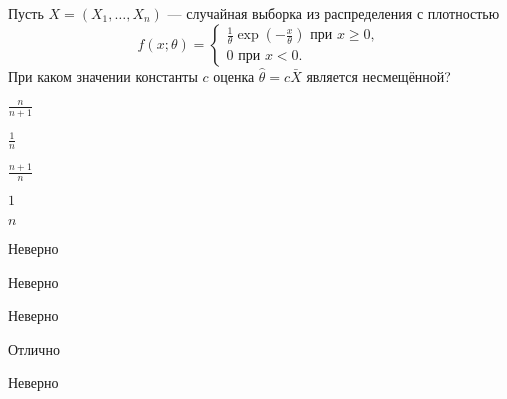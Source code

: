 
\begin{question}
Пусть \(X = (X_1, \ldots , X_n)\) --- случайная выборка из распределения
с плотностью \[
f(x; \theta) =
\begin{cases}
\frac{1}{\theta}\exp(-\frac{x}{\theta}) \text{ при } x \geq 0,  \\
0 \text{ при } x < 0.
\end{cases}
\] При каком значении константы \(c\) оценка
\(\hat{\theta} = c \bar{X}\) является несмещённой?
\begin{answerlist}
  \item \(\frac{n}{n+1}\)
  \item \(\frac{1}{n}\)
  \item \(\frac{n + 1}{n}\)
  \item \(1\)
  \item \(n\)
\end{answerlist}
\end{question}

\begin{solution}
\begin{answerlist}
  \item Неверно
  \item Неверно
  \item Неверно
  \item Отлично
  \item Неверно
\end{answerlist}
\end{solution}

